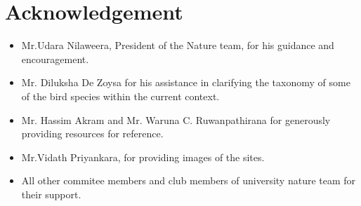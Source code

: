 \chapter{Acknowledgement}
\label{cp:Acknowledgement}
\begin{itemize}
    \item Mr.Udara Nilaweera, President of the Nature team, for his guidance and encouragement.\\
    \item Mr. Diluksha De Zoysa for his assistance in clarifying the taxonomy of some of the bird species within the current context.\\
    \item Mr. Hassim Akram and Mr. Waruna C. Ruwanpathirana for generously providing resources for reference.\\
    \item Mr.Vidath Priyankara, for providing images of the sites.
    \\
    \item All other commitee members and club members of university nature team for their support.
\end{itemize}